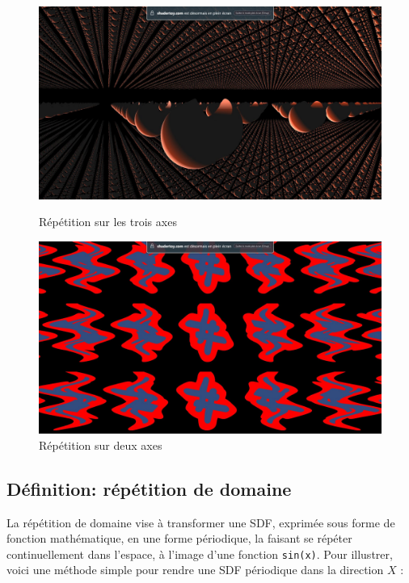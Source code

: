 \begin{figure}[h]
  \begin{minipage}[b]{0.45\linewidth}
    \centering
    \includegraphics[width=\linewidth]{images/shaders/shaderatelier_02.jpg}
    \caption{Répétition sur les trois axes}
    \label{shadat02}
  \end{minipage}
  \hspace{0.1\linewidth} %
  \begin{minipage}[b]{0.45\linewidth}
    \centering
    \includegraphics[width=\linewidth]{images/shaders/shaderatelier_04.jpg}
    \caption{Répétition sur deux axes}
    \label{shadat04}
  \end{minipage}
\end{figure}

\subsection*{Définition: répétition de domaine}
La répétition de domaine vise à transformer une SDF, exprimée sous forme de fonction mathématique, en une forme périodique, la faisant se répéter continuellement dans l'espace, à l'image d'une fonction \lstinline{sin(x)}. Pour illustrer, voici une méthode simple pour rendre une SDF périodique dans la direction $X$ :

